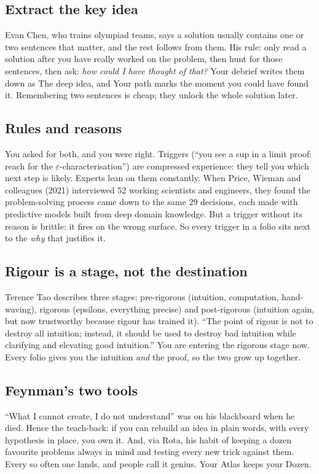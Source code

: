 \documentclass{kaelearn}
\begin{document}
\subsection{Extract the key idea}
Evan Chen, who trains olympiad teams, says a solution usually contains one or two sentences that
matter, and the rest follows from them. His rule: only read a solution after you have really
worked on the problem, then hunt for those sentences, then ask: \emph{how could I have thought of
that?} Your debrief writes them down as \textsf{The deep idea}, and \textsf{Your path} marks the moment you could have found it.
Remembering two sentences is cheap; they unlock the whole solution later.

\subsection{Rules and reasons}
You asked for both, and you were right. Triggers (``you see a sup in a limit proof: reach for the
$\varepsilon$-characterisation'') are compressed experience: they tell you which next step is
likely. Experts lean on them constantly. When Price, Wieman and colleagues (2021) interviewed 52
working scientists and engineers, they found the problem-solving process came down to the same 29
decisions, each made with predictive models built from deep domain knowledge. But a trigger
without its reason is brittle: it fires on the wrong surface. So every trigger in a folio sits
next to the \emph{why} that justifies it.

\subsection{Rigour is a stage, not the destination}
Terence Tao describes three stages: pre-rigorous (intuition, computation, hand-waving), rigorous
(epsilons, everything precise) and post-rigorous (intuition again, but now trustworthy because
rigour has trained it). ``The point of rigour is not to destroy all intuition; instead, it should
be used to destroy bad intuition while clarifying and elevating good intuition.'' You are entering
the rigorous stage now. Every folio gives you the intuition \emph{and} the proof, so the two grow
up together.

\subsection{Feynman's two tools}
``What I cannot create, I do not understand'' was on his blackboard when he died. Hence the
teach-back: if you can rebuild an idea in plain words, with every hypothesis in place, you own it.
And, via Rota, his habit of keeping a dozen favourite problems always in mind and testing every
new trick against them. Every so often one lands, and people call it genius. Your Atlas keeps
your Dozen.
\end{document}

